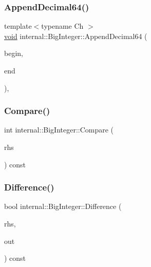 \subsubsection{\texorpdfstring{Append\+Decimal64()}{AppendDecimal64()}}
{\footnotesize\ttfamily template$<$typename Ch $>$ \\
\hyperlink{imgui__impl__opengl3__loader_8h_ac668e7cffd9e2e9cfee428b9b2f34fa7}{void} internal\+::\+Big\+Integer\+::\+Append\+Decimal64 (\begin{DoxyParamCaption}\item[{const Ch $\ast$}]{begin,  }\item[{const Ch $\ast$}]{end }\end{DoxyParamCaption})\hspace{0.3cm}{\ttfamily [inline]}, {\ttfamily [private]}}

\mbox{\label{classinternal_1_1BigInteger_af8e90fff5382de6c1cda5f751017200c}} 
\subsubsection{\texorpdfstring{Compare()}{Compare()}}
{\footnotesize\ttfamily int internal\+::\+Big\+Integer\+::\+Compare (\begin{DoxyParamCaption}\item[{const \hyperlink{classinternal_1_1BigInteger}{Big\+Integer} \&}]{rhs }\end{DoxyParamCaption}) const\hspace{0.3cm}{\ttfamily [inline]}}

\mbox{\label{classinternal_1_1BigInteger_ad7ad62e6b62af38283ee940eb4015b26}} 
\subsubsection{\texorpdfstring{Difference()}{Difference()}}
{\footnotesize\ttfamily bool internal\+::\+Big\+Integer\+::\+Difference (\begin{DoxyParamCaption}\item[{const \hyperlink{classinternal_1_1BigInteger}{Big\+Integer} \&}]{rhs,  }\item[{\hyperlink{classinternal_1_1BigInteger}{Big\+Integer} $\ast$}]{out }\end{DoxyParamCaption}) const\hspace{0.3cm}{\ttfamily [inline]}}

